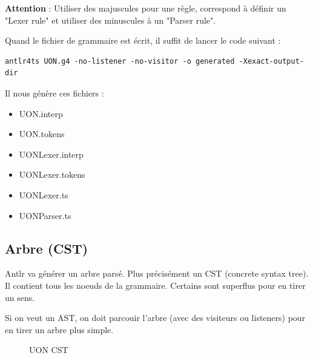\documentclass[
    iict, %
    il, %
]{heig-tb}
\begin{document}
\textbf{Attention} : Utiliser des majuscules pour une règle, correspond à définir un "Lexer rule" et utiliser des minuscules à un  "Parser rule".

Quand le fichier de grammaire est écrit, il suffit de lancer le code suivant :

\begin{lstlisting}[frame=single]
    antlr4ts UON.g4 -no-listener -no-visitor -o generated -Xexact-output-dir
\end{lstlisting}

Il nous génère ces fichiers :
\begin{itemize}
    \item UON.interp
    \item UON.tokens
    \item UONLexer.interp
    \item UONLexer.tokens
    \item UONLexer.ts
    \item UONParser.ts
\end{itemize}

\subsection{Arbre (CST)}
Antlr va générer un arbre parsé. Plus précisément un CST (concrete syntax tree).
Il contient tous les noeuds de la grammaire. Certains sont superflus pour en tirer un sens.

Si on veut un AST, on doit parcouir l'arbre (avec des visiteurs ou listeners) pour en tirer un arbre plus simple.

\begin{figure}[!h]
    \begin{center}
    \end{center}
    \caption[UON CST]{\label{uon-tree} UON CST}
\end{figure}
\end{document}
